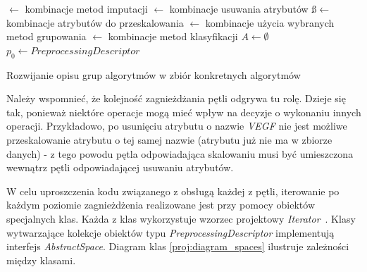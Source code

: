 \documentclass[../thesis.tex]{subfiles}
\begin{document}
\begin{algorithm}[ht]
  
  \is$\leftarrow$ kombinacje metod imputacji\;
  \rs$\leftarrow$ kombinacje usuwania atrybutów\;
  \ss$\leftarrow$ kombinacje atrybutów do przeskalowania\;
  \gs$\leftarrow$ kombinacje użycia wybranych metod grupowania\;
  \cs$\leftarrow$ kombinacje metod klasyfikacji\;
  \BlankLine
  $A \leftarrow \emptyset$\;
  $p_0 \leftarrow PreprocessingDescriptor$\;
  \caption{Rozwijanie opisu grup algorytmów w zbiór konkretnych algorytmów}
  \label{proj:algorithm_loops}
\end{algorithm}

Należy wspomnieć, że kolejność zagnieżdżania pętli odgrywa tu rolę. Dzieje się tak, ponieważ niektóre operacje mogą mieć wpływ na decyzje o wykonaniu innych operacji. Przykładowo, po usunięciu atrybutu o nazwie \emph{VEGF} nie jest możliwe przeskalowanie atrybutu o tej samej nazwie (atrybutu już nie ma w zbiorze danych) - z tego powodu pętla odpowiadająca skalowaniu musi być umieszczona wewnątrz pętli odpowiadającej usuwaniu atrybutów. 

W celu uproszczenia kodu związanego z obsługą każdej z pętli, iterowanie po każdym poziomie zagnieżdżenia realizowane jest przy pomocy obiektów specjalnych klas. Każda z klas wykorzystuje wzorzec projektowy \emph{Iterator}~\cite{gang_of_four}. Klasy wytwarzające kolekcje obiektów typu \emph{PreprocessingDescriptor} implementują interfejs \emph{AbstractSpace}. Diagram klas \ref{proj:diagram_spaces} ilustruje zależności między klasami.
\end{document}
